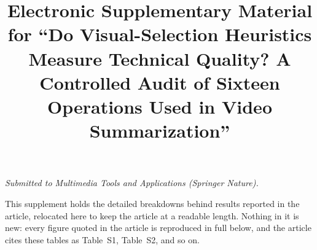 \documentclass[sn-basic,Numbered]{sn-jnl}
\begin{document}


\title[Supplementary material]{Electronic Supplementary Material for
``Do Visual-Selection Heuristics Measure Technical Quality? A Controlled Audit of Sixteen Operations Used in Video Summarization''}

\author*[1]{ }
\author[1]{ }

\maketitle

\noindent\small\emph{Submitted to Multimedia Tools and Applications (Springer Nature).}
\normalsize

\renewcommand{\thetable}{S\arabic{table}}
\renewcommand{\theHtable}{S\arabic{table}}
\renewcommand{\thefigure}{S\arabic{figure}}
\renewcommand{\theHfigure}{S\arabic{figure}}
\setcounter{table}{0}

This supplement holds the detailed breakdowns behind results reported in the
article, relocated here to keep the article at a readable length. Nothing in it
is new: every figure quoted in the article is reproduced in full below, and the
article cites these tables as Table~S1, Table~S2, and so on.
\end{document}
